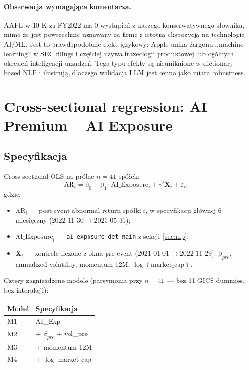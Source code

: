 \documentclass[11pt,a4paper]{article}
\begin{document}
\paragraph{Obserwacja wymagająca komentarza.}
AAPL w 10-K za FY2022 ma $0$ wystąpień z naszego konserwatywnego słownika,
mimo że jest powszechnie uznawany za firmę z istotną ekspozycją na technologie
AI/ML. Jest to prawdopodobnie efekt językowy: Apple unika żargonu
,,machine learning'' w SEC filings i częściej używa frazeologii produktowej
lub ogólnych określeń inteligencji urządzeń. Tego typu efekty są nieuniknione
w dictionary-based NLP i ilustrują, dlaczego walidacja LLM jest cenna jako
miara robustness.

\clearpage
\section{Cross-sectional regression: AI Premium ~ AI Exposure}
\label{sec:cross}

\subsection{Specyfikacja}
Cross-sectional OLS na próbie $n=41$ spółek:
\[
  \text{AR}_i = \beta_0 + \beta_1 \cdot \text{AI\_Exposure}_i
              + \gamma' \mathbf{X}_i + \varepsilon_i,
\]
gdzie:
\begin{itemize}
  \item $\text{AR}_i$ --- post-event abnormal return spółki $i$, w specyfikacji
        głównej 6-miesięczny ($2022\text{-}11\text{-}30 \to 2023\text{-}05\text{-}31$);
  \item $\text{AI\_Exposure}_i$ --- \texttt{ai\_exposure\_det\_main} z sekcji~\ref{sec:nlp};
  \item $\mathbf{X}_i$ --- kontrole liczone z okna pre-event
        ($2021\text{-}01\text{-}01 \to 2022\text{-}11\text{-}29$):
        $\beta_{pre}$, annualized volatility, momentum 12M,
        $\log(\text{market\_cap})$.
\end{itemize}

Cztery zagnieżdżone modele (parsymonia przy $n=41$ --- bez 11 GICS dummies,
bez interakcji):

\begin{center}\small
\begin{tabular}{ll}
\toprule
Model & Specyfikacja \\
\midrule
M1 & AI\_Exp \\
M2 & + $\beta_{pre}$ + vol\_pre \\
M3 & + momentum 12M \\
M4 & + $\log$ market cap \\
\bottomrule
\end{tabular}
\end{center}
\end{document}
